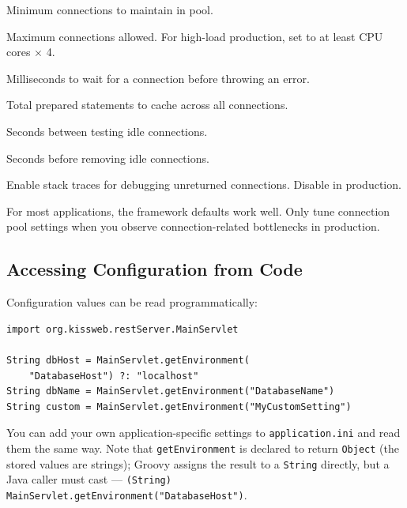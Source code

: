 \begin{description}[style=nextline]
  \item[\texttt{DatabaseMinPoolSize}] Minimum connections to maintain in pool.
  \item[\texttt{DatabaseMaxPoolSize}] Maximum connections allowed.  For high-load production, set to at least CPU cores $\times$ 4.
  \item[\texttt{DatabaseCheckoutTimeout}] Milliseconds to wait for a connection before throwing an error.
  \item[\texttt{DatabaseMaxStatements}] Total prepared statements to cache across all connections.
  \item[\texttt{DatabaseIdleTestPeriod}] Seconds between testing idle connections.
  \item[\texttt{DatabaseMaxIdleTime}] Seconds before removing idle connections.
  \item[\texttt{DatabaseDebugStackTraces}] Enable stack traces for debugging unreturned connections.  Disable in production.
\end{description}

\begin{tipbox}
For most applications, the framework defaults work well.  Only tune connection pool settings when you observe connection-related bottlenecks in production.
\end{tipbox}

\subsection{Accessing Configuration from Code}

Configuration values can be read programmatically:

\begin{lstlisting}[style=groovy]
import org.kissweb.restServer.MainServlet

String dbHost = MainServlet.getEnvironment(
    "DatabaseHost") ?: "localhost"
String dbName = MainServlet.getEnvironment("DatabaseName")
String custom = MainServlet.getEnvironment("MyCustomSetting")
\end{lstlisting}

\noindent
You can add your own application-specific settings to \texttt{application.ini} and read them the same way.  Note that \texttt{getEnvironment} is declared to return \texttt{Object} (the stored values are strings); Groovy assigns the result to a \texttt{String} directly, but a Java caller must cast --- \texttt{(String) MainServlet.getEnvironment("DatabaseHost")}.

